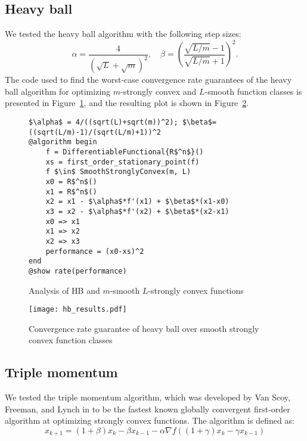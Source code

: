 \subsection*{Heavy ball}

We tested the heavy ball algorithm with the following step sizes:
\[
\alpha = \frac{4}{\left( \sqrt{L} + \sqrt{m} \right)^2}, \quad
\beta = \left( \frac{\sqrt{L/m} - 1}{\sqrt{L/m} + 1} \right)^2.
\]
The code used to find the worst-case convergence rate guarantees of the heavy ball algorithm for optimizing $m$-strongly convex and $L$-smooth function classes is presented in Figure~\ref{hb_code}, and the resulting plot is shown in Figure~\ref{hb_results}.


\begin{figure}[h!]
	\begin{lstlisting}[mathescape]
$\alpha$ = 4/((sqrt(L)+sqrt(m))^2); $\beta$=((sqrt(L/m)-1)/(sqrt(L/m)+1))^2
@algorithm begin
    f = DifferentiableFunctional{R$^n$}()
    xs = first_order_stationary_point(f)
    f $\in$ SmoothStronglyConvex(m, L)
    x0 = R$^n$()
    x1 = R$^n$()
    x2 = x1 - $\alpha$*f'(x1) + $\beta$*(x1-x0)
    x3 = x2 - $\alpha$*f'(x2) + $\beta$*(x2-x1)
    x0 => x1
    x1 => x2
    x2 => x3
    performance = (x0-xs)^2
end
@show rate(performance)
\end{lstlisting}
\caption{Analysis of HB and $m$-smooth $L$-strongly convex functions}
\label{hb_code}
\end{figure}

\begin{figure}[h]
    \centering
    \texttt{[image: hb\_results.pdf]}
    \caption{Convergence rate guarantee of heavy ball over smooth strongly convex function classes}
    \label{hb_results}
\end{figure}

\subsection*{Triple momentum}

We tested the triple momentum algorithm, which was developed by Van Scoy, Freeman, and Lynch in \cite{TMM} to be the fastest known globally convergent first-order algorithm at optimizing strongly convex functions. The algorithm is defined as:
\begin{equation}\label{eqn:GD}
    x_{k+1}= (1+\beta)x_{k} - \beta x_{k-1} - \alpha \nabla f((1+\gamma)x_k - \gamma x_{k-1})
  \end{equation}


